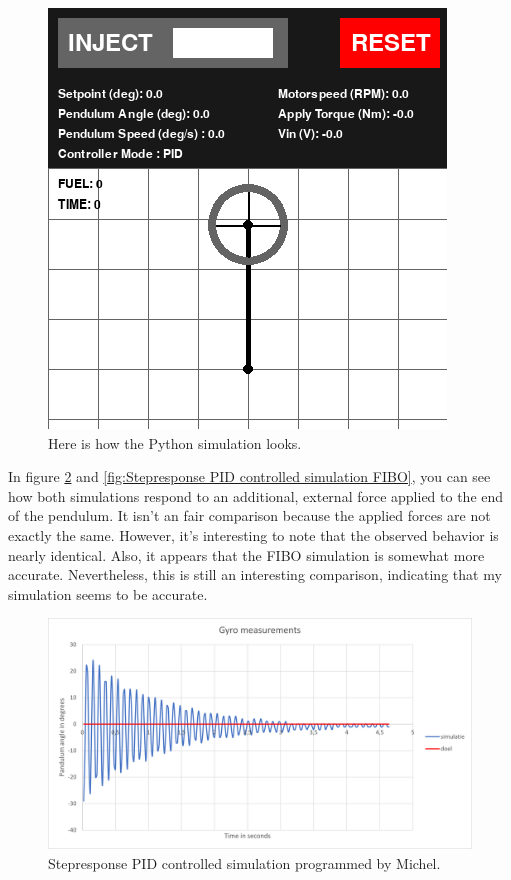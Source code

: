 \documentclass{article}
\begin{document}
\begin{multicols}{2}
\begin{figure}[H]
\centering
\includegraphics[scale=1.5]{simulatie foto}
\caption{Here is how the Python simulation looks.}
\label{fig:Graphic Simulation}
\end{figure}

In figure \ref{fig:Stepresponse PID controlled simulation Michel} and \ref{fig:Stepresponse PID controlled simulation FIBO}, you can see how both simulations respond to an additional, external force applied to the end of the pendulum. It isn't an fair comparison because the applied forces are not exactly the same. However, it's interesting to note that the observed behavior is nearly identical. Also, it appears that the FIBO simulation is somewhat more accurate. Nevertheless, this is still an interesting comparison, indicating that my simulation seems to be accurate.

\begin{figure}[H]
\centering
\includegraphics[scale=0.37]{Stepresponse Michel}
\caption{Stepresponse PID controlled simulation programmed by Michel.}
\label{fig:Stepresponse PID controlled simulation Michel}
\end{figure}


\end{multicols}
\end{document}
